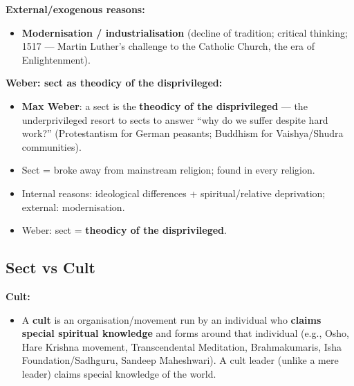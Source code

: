 \begin{DataFact}
\textbf{External/exogenous reasons:}
\begin{itemize}
\item \textbf{Modernisation / industrialisation} (decline of tradition; critical thinking; 1517 --- Martin Luther's challenge to the Catholic Church, the era of Enlightenment).
\end{itemize}
\end{DataFact}

\begin{KeyConcept}
\textbf{Weber: sect as theodicy of the disprivileged:}
\begin{itemize}
\item \textbf{Max Weber}: a sect is the \textbf{theodicy of the disprivileged} --- the underprivileged resort to sects to answer ``why do we suffer despite hard work?'' (Protestantism for German peasants; Buddhism for Vaishya/Shudra communities).
\end{itemize}
\end{KeyConcept}

\begin{QuickRevision}
\begin{itemize}
\item Sect = broke away from mainstream religion; found in every religion.
\item Internal reasons: ideological differences + spiritual/relative deprivation; external: modernisation.
\item Weber: sect = \textbf{theodicy of the disprivileged}.
\end{itemize}
\end{QuickRevision}

\sectiondivider

\subsection{Sect vs Cult}

\begin{KeyConcept}
\textbf{Cult:}
\begin{itemize}
\item A \textbf{cult} is an organisation/movement run by an individual who \textbf{claims special spiritual knowledge} and forms around that individual (e.g., Osho, Hare Krishna movement, Transcendental Meditation, Brahmakumaris, Isha Foundation/Sadhguru, Sandeep Maheshwari). A cult leader (unlike a mere leader) claims special knowledge of the world.
\end{itemize}
\end{KeyConcept}

